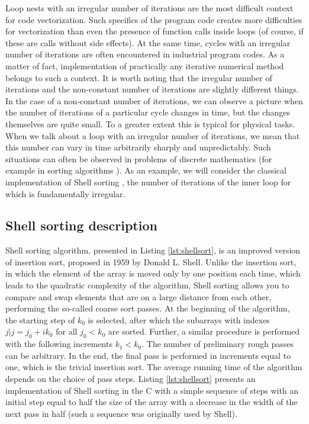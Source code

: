 \documentclass[
11pt,%
tightenlines,%
twoside,%
onecolumn,%
nofloats,%
nobibnotes,%
nofootinbib,%
superscriptaddress,%
noshowpacs,%
centertags]%
{revtex4}
\begin{document}
Loop nests with an irregular number of iterations are the most difficult context for code vectorization.
Such specifics of the program code creates more difficulties for vectorization than even the presence of function calls inside loops (of course, if these are calls without side effects).
At the same time, cycles with an irregular number of iterations are often encountered in industrial program codes.
As a matter of fact, implementation of practically any iterative numerical method belongs to such a context.
It is worth noting that the irregular number of iterations and the non-constant number of iterations are slightly different things.
In the case of a non-constant number of iterations, we can observe a picture when the number of iterations of a particular cycle changes in time, but the changes themselves are quite small.
To a greater extent this is typical for physical tasks.
When we talk about a loop with an irregular number of iterations, we mean that this number can vary in time arbitrarily sharply and unpredictably.
Such situations can often be observed in problems of discrete mathematics (for example in sorting algorithms \cite{Fast_Sort,Quick_Sort,Quick_Sort_2}).
As an example, we will consider the classical implementation of Shell sorting \cite{Knuth}, the number of iterations of the inner loop for which is fundamentally irregular.

\subsection{Shell sorting description}

Shell sorting algorithm, presented in Listing \ref{lst:shellsort}, is an improved version of insertion sort, proposed in 1959 by Donald L. Shell. 
Unlike the insertion sort, in which the element of the array is moved only by one position each time, which leads to the quadratic complexity of the algorithm, Shell sorting allows you to compare and swap elements that are on a large distance from each other, performing the so-called coarse sort passes. At the beginning of the algorithm, the starting step of $ k_0 $ is selected, after which the subarrays with indexes $ {j | j = j_0 + ik_0} $ for all $ j_0  < k_0 $ are sorted. 
Further, a similar procedure is performed with the following increments $ k_1  < k_0 $. 
The number of preliminary rough passes can be arbitrary. In the end, the final pass is performed in increments equal to one, which is the trivial insertion sort. 
The average running time of the algorithm depends on the choice of pass steps. 
Listing \ref{lst:shellsort} presents an implementation of Shell sorting in the C with a simple sequence of steps with an initial step equal to half the size of the array with a decrease in the width of the next pass in half (such a sequence was originally used by Shell). 
\end{document}
